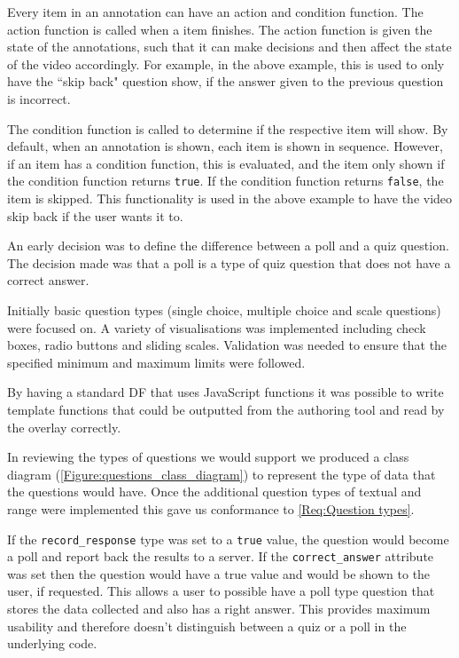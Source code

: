 Every item in an annotation can have an action and condition function. The action function is called when a item finishes. The action function is given the state of the annotations, such that it can make decisions and then affect the state of the video accordingly. For example, in the above example, this is used to only have the ``skip back" question show, if the answer given to the previous question is incorrect.

The condition function is called to determine if the respective item will show. By default, when an annotation is shown, each item is shown in sequence. However, if an item has a condition function, this is evaluated, and the item only shown if the condition function returns \lstinline|true|. If the condition function returns \lstinline|false|, the item is skipped. This functionality is used in the above example to have the video skip back if the user wants it to.

An early decision was to define the difference between a poll and a quiz question. The decision made was that a poll is a type of quiz question that does not have a correct answer.

Initially basic question types (single choice, multiple choice and scale questions) were focused on. A variety of visualisations was implemented including check boxes, radio buttons and sliding scales. Validation was needed to ensure that the specified minimum and maximum limits were followed.

By having a standard \gls{DF} that uses JavaScript functions it was possible to write template functions that could be outputted from the authoring tool and read by the overlay correctly.

In reviewing the types of questions we would support we produced a class diagram (\autoref{Figure:questions_class_diagram}) to represent the type of data that the questions would have. Once the additional question types of textual and range were implemented this gave us conformance to \cref{Req:Question types}.

If the \lstinline|record_response| type was set to a \lstinline|true| value, the question would become a poll and report back the results to a server. If the \lstinline|correct_answer| attribute was set then the question would have a true value and would be shown to the user, if requested. This allows a user to possible have a poll type question that stores the data collected and also has a right answer. This provides maximum usability and therefore doesn't distinguish between a quiz or a poll in the underlying code.

